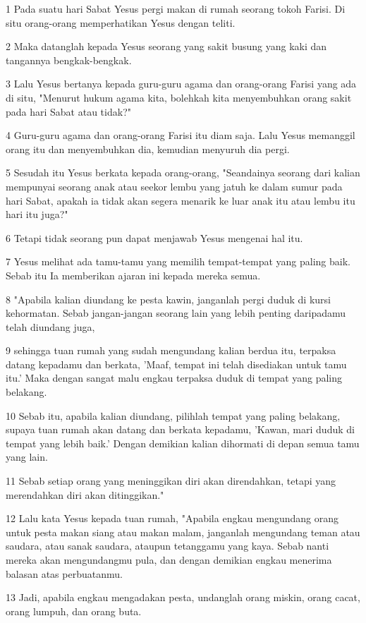 \par 1 Pada suatu hari Sabat Yesus pergi makan di rumah seorang tokoh Farisi. Di situ orang-orang memperhatikan Yesus dengan teliti.
\par 2 Maka datanglah kepada Yesus seorang yang sakit busung yang kaki dan tangannya bengkak-bengkak.
\par 3 Lalu Yesus bertanya kepada guru-guru agama dan orang-orang Farisi yang ada di situ, "Menurut hukum agama kita, bolehkah kita menyembuhkan orang sakit pada hari Sabat atau tidak?"
\par 4 Guru-guru agama dan orang-orang Farisi itu diam saja. Lalu Yesus memanggil orang itu dan menyembuhkan dia, kemudian menyuruh dia pergi.
\par 5 Sesudah itu Yesus berkata kepada orang-orang, "Seandainya seorang dari kalian mempunyai seorang anak atau seekor lembu yang jatuh ke dalam sumur pada hari Sabat, apakah ia tidak akan segera menarik ke luar anak itu atau lembu itu hari itu juga?"
\par 6 Tetapi tidak seorang pun dapat menjawab Yesus mengenai hal itu.
\par 7 Yesus melihat ada tamu-tamu yang memilih tempat-tempat yang paling baik. Sebab itu Ia memberikan ajaran ini kepada mereka semua.
\par 8 "Apabila kalian diundang ke pesta kawin, janganlah pergi duduk di kursi kehormatan. Sebab jangan-jangan seorang lain yang lebih penting daripadamu telah diundang juga,
\par 9 sehingga tuan rumah yang sudah mengundang kalian berdua itu, terpaksa datang kepadamu dan berkata, 'Maaf, tempat ini telah disediakan untuk tamu itu.' Maka dengan sangat malu engkau terpaksa duduk di tempat yang paling belakang.
\par 10 Sebab itu, apabila kalian diundang, pilihlah tempat yang paling belakang, supaya tuan rumah akan datang dan berkata kepadamu, 'Kawan, mari duduk di tempat yang lebih baik.' Dengan demikian kalian dihormati di depan semua tamu yang lain.
\par 11 Sebab setiap orang yang meninggikan diri akan direndahkan, tetapi yang merendahkan diri akan ditinggikan."
\par 12 Lalu kata Yesus kepada tuan rumah, "Apabila engkau mengundang orang untuk pesta makan siang atau makan malam, janganlah mengundang teman atau saudara, atau sanak saudara, ataupun tetanggamu yang kaya. Sebab nanti mereka akan mengundangmu pula, dan dengan demikian engkau menerima balasan atas perbuatanmu.
\par 13 Jadi, apabila engkau mengadakan pesta, undanglah orang miskin, orang cacat, orang lumpuh, dan orang buta.
